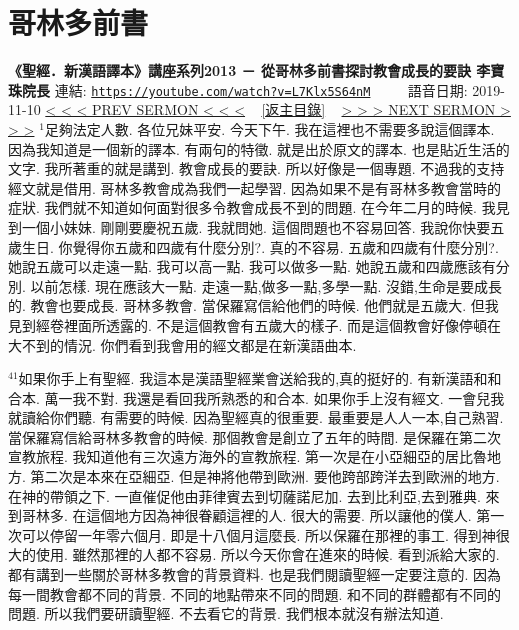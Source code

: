 \documentclass{book}
\begin{document}
\section{哥林多前書}
\label{sec:L7Klx5S64nM}
\textbf{《聖經．新漢語譯本》講座系列2013 － 從哥林多前書探討教會成長的要訣 李寶珠院長}
\newline
\newline
連結: \href{https://youtube.com/watch?v=L7Klx5S64nM}{\texttt{https://youtube.com/watch?v=L7Klx5S64nM}} ~~~~ 語音日期: 2019-11-10
\newline
\newline
\hyperref[sec:9gWlq_OvVJU]{\small{< < < PREV SERMON < < <}}
~
\hyperref[sec:index]{\small{[返主目錄]}}
~
\hyperref[sec:WEwyO2xJwfc]{\small{> > > NEXT SERMON > > >}}
\newline
\newline
$^{1}$足夠法定人數.
各位兄妹平安.
今天下午.
我在這裡也不需要多說這個譯本.
因為我知道是一個新的譯本.
有兩句的特徵.
就是出於原文的譯本.
也是貼近生活的文字.
我所著重的就是講到.
教會成長的要訣.
所以好像是一個專題.
不過我的支持經文就是借用.
哥林多教會成為我們一起學習.
因為如果不是有哥林多教會當時的症狀.
我們就不知道如何面對很多令教會成長不到的問題.
在今年二月的時候.
我見到一個小妹妹.
剛剛要慶祝五歲.
我就問她.
這個問題也不容易回答.
我說你快要五歲生日.
你覺得你五歲和四歲有什麼分別?.
真的不容易.
五歲和四歲有什麼分別?.
她說五歲可以走遠一點.
我可以高一點.
我可以做多一點.
她說五歲和四歲應該有分別.
以前怎樣.
現在應該大一點.
走遠一點,做多一點,多學一點.
沒錯,生命是要成長的.
教會也要成長.
哥林多教會.
當保羅寫信給他們的時候.
他們就是五歲大.
但我見到經卷裡面所透露的.
不是這個教會有五歲大的樣子.
而是這個教會好像停頓在大不到的情況.
你們看到我會用的經文都是在新漢語曲本.

$^{41}$如果你手上有聖經.
我這本是漢語聖經業會送給我的,真的挺好的.
有新漢語和和合本.
萬一我不對.
我還是看回我所熟悉的和合本.
如果你手上沒有經文.
一會兒我就讀給你們聽.
有需要的時候.
因為聖經真的很重要.
最重要是人人一本,自己熟習.
當保羅寫信給哥林多教會的時候.
那個教會是創立了五年的時間.
是保羅在第二次宣教旅程.
我知道他有三次遠方海外的宣教旅程.
第一次是在小亞細亞的居比魯地方.
第二次是本來在亞細亞.
但是神將他帶到歐洲.
要他跨部跨洋去到歐洲的地方.
在神的帶領之下.
一直催促他由菲律賓去到切薩諾尼加.
去到比利亞,去到雅典.
來到哥林多.
在這個地方因為神很眷顧這裡的人.
很大的需要.
所以讓他的僕人.
第一次可以停留一年零六個月.
即是十八個月這麼長.
所以保羅在那裡的事工.
得到神很大的使用.
雖然那裡的人都不容易.
所以今天你會在進來的時候.
看到派給大家的.
都有講到一些關於哥林多教會的背景資料.
也是我們閱讀聖經一定要注意的.
因為每一間教會都不同的背景.
不同的地點帶來不同的問題.
和不同的群體都有不同的問題.
所以我們要研讀聖經.
不去看它的背景.
我們根本就沒有辦法知道.
\end{document}

